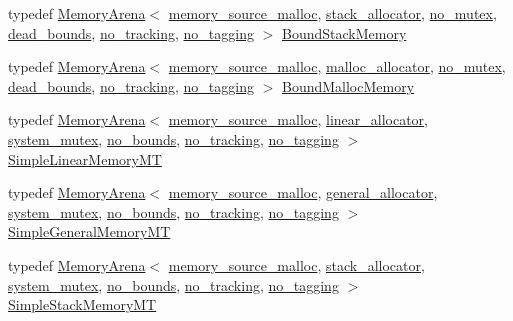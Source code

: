 \begin{DoxyCompactItemize}
\item 
typedef \hyperlink{classcrap_1_1_memory_arena}{Memory\+Arena}$<$ \hyperlink{classcrap_1_1memory__source__malloc}{memory\+\_\+source\+\_\+malloc}, \hyperlink{classcrap_1_1stack__allocator}{stack\+\_\+allocator}, \hyperlink{structcrap_1_1no__mutex}{no\+\_\+mutex}, \hyperlink{structcrap_1_1dead__bounds}{dead\+\_\+bounds}, \hyperlink{structcrap_1_1no__tracking}{no\+\_\+tracking}, \hyperlink{structcrap_1_1no__tagging}{no\+\_\+tagging} $>$ \hyperlink{namespacecrap_af1fa4a94e1cfd326b0c488a328e154a3}{Bound\+Stack\+Memory}
\item 
typedef \hyperlink{classcrap_1_1_memory_arena}{Memory\+Arena}$<$ \hyperlink{classcrap_1_1memory__source__malloc}{memory\+\_\+source\+\_\+malloc}, \hyperlink{classcrap_1_1malloc__allocator}{malloc\+\_\+allocator}, \hyperlink{structcrap_1_1no__mutex}{no\+\_\+mutex}, \hyperlink{structcrap_1_1dead__bounds}{dead\+\_\+bounds}, \hyperlink{structcrap_1_1no__tracking}{no\+\_\+tracking}, \hyperlink{structcrap_1_1no__tagging}{no\+\_\+tagging} $>$ \hyperlink{namespacecrap_a8d06ec26605b8fbab3675d68bc669a2b}{Bound\+Malloc\+Memory}
\item 
typedef \hyperlink{classcrap_1_1_memory_arena}{Memory\+Arena}$<$ \hyperlink{classcrap_1_1memory__source__malloc}{memory\+\_\+source\+\_\+malloc}, \hyperlink{classcrap_1_1linear__allocator}{linear\+\_\+allocator}, \hyperlink{classcrap_1_1system__mutex}{system\+\_\+mutex}, \hyperlink{structcrap_1_1no__bounds}{no\+\_\+bounds}, \hyperlink{structcrap_1_1no__tracking}{no\+\_\+tracking}, \hyperlink{structcrap_1_1no__tagging}{no\+\_\+tagging} $>$ \hyperlink{namespacecrap_a98a843d877d8c0558c40574d0a0019e3}{Simple\+Linear\+Memory\+M\+T}
\item 
typedef \hyperlink{classcrap_1_1_memory_arena}{Memory\+Arena}$<$ \hyperlink{classcrap_1_1memory__source__malloc}{memory\+\_\+source\+\_\+malloc}, \hyperlink{classcrap_1_1general__allocator}{general\+\_\+allocator}, \hyperlink{classcrap_1_1system__mutex}{system\+\_\+mutex}, \hyperlink{structcrap_1_1no__bounds}{no\+\_\+bounds}, \hyperlink{structcrap_1_1no__tracking}{no\+\_\+tracking}, \hyperlink{structcrap_1_1no__tagging}{no\+\_\+tagging} $>$ \hyperlink{namespacecrap_a8c3afedb9f5acb5aa0e4e2767ccf0118}{Simple\+General\+Memory\+M\+T}
\item 
typedef \hyperlink{classcrap_1_1_memory_arena}{Memory\+Arena}$<$ \hyperlink{classcrap_1_1memory__source__malloc}{memory\+\_\+source\+\_\+malloc}, \hyperlink{classcrap_1_1stack__allocator}{stack\+\_\+allocator}, \hyperlink{classcrap_1_1system__mutex}{system\+\_\+mutex}, \hyperlink{structcrap_1_1no__bounds}{no\+\_\+bounds}, \hyperlink{structcrap_1_1no__tracking}{no\+\_\+tracking}, \hyperlink{structcrap_1_1no__tagging}{no\+\_\+tagging} $>$ \hyperlink{namespacecrap_aa7a4e4bf8df096c0ab06b0fdbf4c3c0f}{Simple\+Stack\+Memory\+M\+T}

\end{DoxyCompactItemize}
